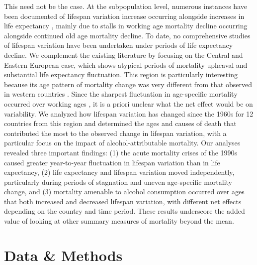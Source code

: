 \documentclass{article}
\begin{document}
\begin{spacing}{1.5}
This need not be the case. At the subpopulation level, numerous instances have been documented of lifespan variation increase occurring alongside increases in life expectancy \citep{vanraalte2014,sasson2016trends,seaman2016increasing, bronnum-hansen2017}, mainly due to stalls in working age mortality decline occurring alongside continued old age mortality decline. To date, no comprehensive studies of lifespan variation have been undertaken under periods of life expectancy decline.
We complement the existing literature by focusing on the Central and Eastern European case, which shows atypical periods of mortality upheaval and substantial life expectancy fluctuation. This region is particularly interesting because its age pattern of mortality change was very different from that observed in western countries \citep{mesle2004mortality}. Since the sharpest fluctuation in age-specific mortality occurred over working ages \citep{rehm2007}, it is a priori unclear what the net effect would be on variability. We analyzed how lifespan variation has changed since the 1960s for 12 countries from this region and determined the ages and causes of death that contributed the most to the observed change in lifespan variation, with a particular focus on the impact of alcohol-attributable mortality. 
Our analyses revealed three important findings: (1) the acute mortality crises of the 1990s caused greater year-to-year fluctuation in lifespan variation than in life expectancy, (2) life expectancy and lifespan variation moved independently, particularly during periods of stagnation and uneven age-specific mortality change, and (3) mortality amenable to alcohol consumption occurred over ages that both increased and decreased lifespan variation, with different net effects depending on the country and time period. These results underscore the added value of looking at other summary measures of mortality beyond the mean.


\section*{Data \& Methods}


\end{spacing}
\end{document}
